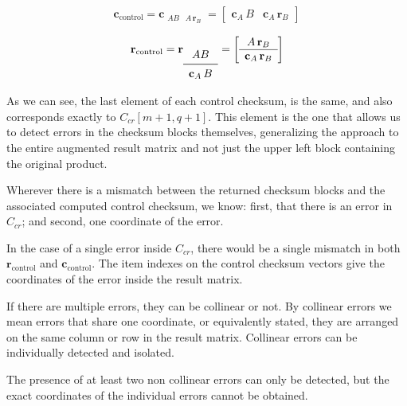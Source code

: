 \begin{enumerate}
    \[
      \mathbf{c}_{\text{control}} = \mathbf{c}_{
        \begin{array}{c|c}
          A B & A \, \mathbf{r}_B
        \end{array}
      } =
      \left[
        \begin{array}{c|c}
          \mathbf{c}_A \, B &
          \mathbf{c}_A \, \mathbf{r}_B
        \end{array}
      \right]
    \]

    \[
      \mathbf{r}_{\text{control}} = \mathbf{r}_{
        \begin{array}{c}
          AB \\
          \midrule
          \mathbf{c}_A \, B
      \end{array}} =
      \left[
        \begin{array}{c}
          A \, \mathbf{r}_B \\
          \hline
          \mathbf{c}_A \, \mathbf{r}_B
        \end{array}
      \right]
    \]

    As we can see, the last element of each control checksum, is the same,
    and also corresponds exactly to $C_{cr}\left[m+1,q+1\right]$.
    This element is the one that allows us to detect errors
    in the checksum blocks themselves, generalizing the approach to the entire
    augmented result matrix and not just the upper left block containing the original product.

    Wherever there is a mismatch between the returned checksum blocks and the associated computed control checksum,
    we know: first, that there is an error in $C_{cr}$; and second, one coordinate of the error.

    In the case of a single error inside $C_{cr}$,
    there would be a single mismatch in both
    $\mathbf{r}_{\text{control}}$ and $\mathbf{c}_{\text{control}}$.
    The item indexes on the control checksum vectors
    give the coordinates of the error inside the result matrix.

    If there are multiple errors, they can be collinear or not.
    By collinear errors we mean errors that share one coordinate,
    or equivalently stated,
    they are arranged on the same column or row in the result matrix.
    Collinear errors can be individually detected and isolated.

    The presence of at least two non collinear errors
    can only be detected, but the exact coordinates of the individual errors
    cannot be obtained.


\end{enumerate}
